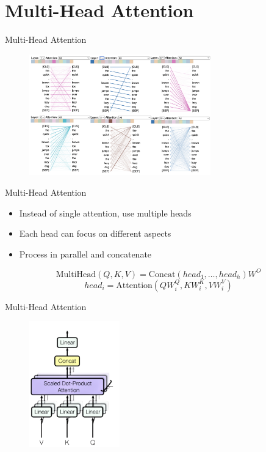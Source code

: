 \documentclass[serif, aspectratio=169]{beamer}
\begin{document}
\section{Multi-Head Attention}

\begin{frame}{Multi-Head Attention}

    \begin{figure}
        \centering
        \includegraphics[width=0.7\textwidth]{pic/multihead-attention-1.png}
        \label{fig:multihead_attention-1}
    \end{figure}
\end{frame}

\begin{frame}{Multi-Head Attention}
    \begin{itemize}
        \item Instead of single attention, use multiple heads
        \item Each head can focus on different aspects
        \item Process in parallel and concatenate
    \end{itemize}
    \begin{equation*}
        \text{MultiHead}(Q,K,V) = \text{Concat}(head_1,\ldots,head_h)W^O
    \end{equation*}
    \begin{equation*}
        head_i = \text{Attention}(QW^Q_i,KW^K_i,VW^V_i)
    \end{equation*}
\end{frame}

\begin{frame}{Multi-Head Attention}

    \begin{figure}
        \centering
        \includegraphics[width=0.35\textwidth]{pic/multihead-attention-2.png}
        \label{fig:multihead_attention}
    \end{figure}
\end{frame}
\end{document}
